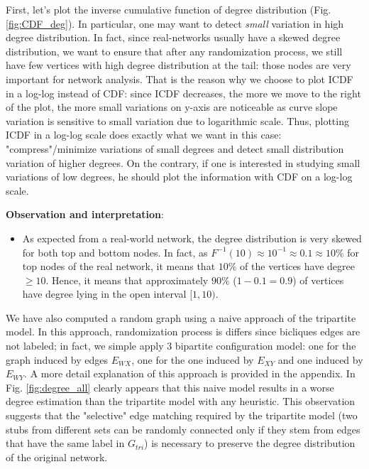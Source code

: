 \documentclass[table]{report}
\begin{document}
First, let's plot the inverse cumulative function of degree distribution (Fig. \ref{fig:CDF_deg}). In particular, one may want to detect \textit{small} variation in high degree distribution. In fact, since real-networks usually have a skewed degree distribution, we want to ensure that after any randomization process, we still have few vertices with high degree distribution at the tail: those nodes are very important for network analysis. That is the reason why we choose to plot ICDF in a log-log instead of CDF: since ICDF decreases, the more we move to the right of the plot, the more small variations on y-axis are noticeable as curve slope variation is sensitive to small variation due to logarithmic scale. Thus, plotting ICDF in a log-log scale does exactly what we want in this case: "compress"/minimize variations of small degrees and detect small distribution variation of higher degrees. 
On the contrary, if one is interested in studying small variations of low degrees, he should plot the information with CDF on a log-log scale. 

\bigbreak

\noindent
\textbf{Observation and interpretation}:

\begin{itemize}[noitemsep]
    \item As expected from a real-world network, the degree distribution is very skewed for both top and bottom nodes. In fact, as $F^{-1}(10) \approx 10^{-1} \approx 0.1 \approx 10 \%$ for top nodes of the real network, it means that $10 \%$ of the vertices have degree $\geq 10$. Hence, it means that approximately $90 \%$ ($1-0.1 = 0.9$) of vertices have degree lying in the open interval $[1,10)$. 
\end{itemize}  

 

We have also computed a random graph using a naive approach of the tripartite model. In this approach, randomization process is differs since bicliques edges are not labeled; in fact, we simple apply 3 bipartite configuration model: one for the graph induced by edges $E_{WX}$, one for the one induced by $E_{XY}$ and one induced by $E_{WY}$.  A more detail explanation of this approach is provided in the appendix. 
In Fig. \ref{fig:degree_all} clearly appears that this naive model results in a worse degree estimation than the tripartite model with any heuristic. This observation suggests that the "selective" edge matching required by the tripartite model (two stubs from different sets can be randomly connected only if they stem from edges that have the same label in ${G_{tri}}$) is necessary to preserve the degree distribution of the original network. 
\end{document}
